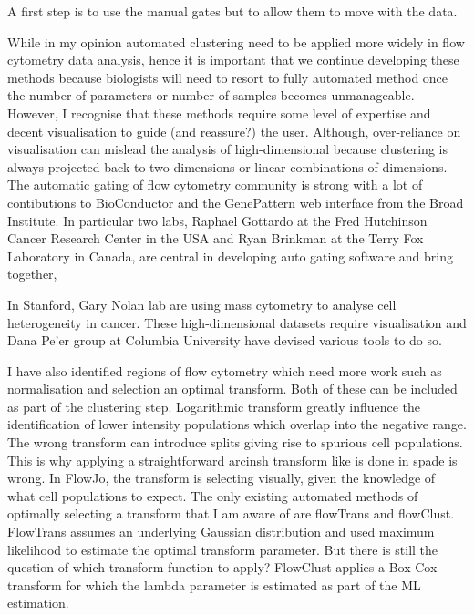 A first step is to use the manual gates but to allow them to move with the data.

While in my opinion automated clustering need to be applied more widely in flow cytometry data analysis,
hence it is important that we continue developing these methods because biologists will need to resort to fully automated method once the number of parameters
or number of samples becomes unmanageable.
However, I recognise that these methods require some level of expertise and decent visualisation to guide (and reassure?) the user.
Although, over-reliance on visualisation can mislead the analysis of high-dimensional because clustering is always projected back to two dimensions
or linear combinations of dimensions.
The automatic gating of flow cytometry community is strong with a lot of contibutions to BioConductor and the GenePattern web interface from the Broad Institute.
In particular two labs,
Raphael Gottardo at the Fred Hutchinson Cancer Research Center in the USA
and
Ryan Brinkman at the Terry Fox Laboratory in Canada,
are central in developing auto gating software and bring together,

In Stanford, Gary Nolan lab are using mass cytometry to analyse cell heterogeneity in cancer.
These high-dimensional datasets require visualisation and Dana Pe'er group at Columbia University have devised various tools to do so.

I have also identified regions of flow cytometry which need more work such as normalisation and selection an optimal transform.
Both of these can be included as part of the clustering step.
Logarithmic transform greatly influence the identification of lower intensity populations which overlap into the negative range.
The wrong transform can introduce splits giving rise to spurious cell populations.
This is why applying a straightforward arcinsh transform like is done in spade is wrong.
In FlowJo, the transform is selecting visually, given the knowledge of what cell populations to expect.
The only existing automated  methods of optimally selecting a transform that I am aware of are flowTrans and flowClust.
FlowTrans assumes an underlying Gaussian distribution and used maximum likelihood to estimate the optimal transform parameter.
But there is still the question of which transform function to apply?
FlowClust applies a Box-Cox transform for which the lambda parameter is estimated as part of the ML estimation.

